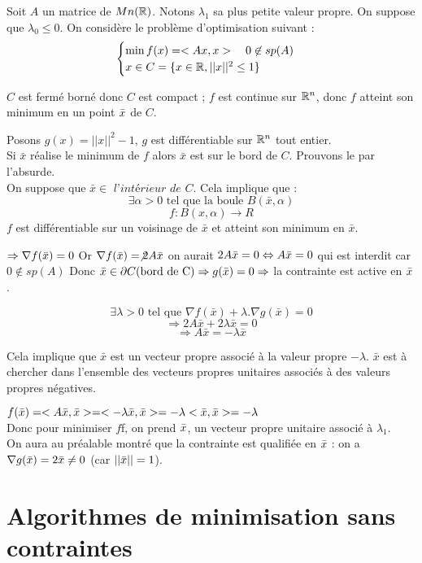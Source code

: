 \begin{exemple}


	Soit $A$ un matrice de $Mn(\mathbb{R})$. Notons $\lambda _1$ sa plus petite valeur propre. On suppose que $\lambda _0 \leq 0$. On considère le problème d'optimisation suivant : \[ \begin{cases}\min f(x) = <Ax, x> \quad 0 \not \in sp(A)\\ x \in C = \{ x \in \mathbb{R}, ||x||^2 \leq 1 \} \end{cases} \]
	
	$C$ est fermé borné donc $C$ est compact ;
	$f$ est continue sur $\mathbb{R}^n$, donc $f$ atteint son minimum en un point $\bar{x}$ de $C$.
	
	Posons $ g(x) = ||x||^2 - 1 $, $g$ est différentiable sur $\mathbb{R}^n$ tout entier.\\
Si $\bar{x}$ réalise le minimum de $f$ alors $\bar{x}$ est sur le bord de $C$. Prouvons le par l'absurde.\\
On suppose que $\bar{x} \in \textit{ l'intérieur de }C $.
Cela implique que : \[ \exists \alpha>0 \text{ tel que la boule } B(\bar{x},\alpha)  \]
\[ f : B(x,\alpha) \rightarrow R \]
$f$ est différentiable sur un voisinage de $\bar{x}$ et atteint son minimum en $\bar{x}$.
	
	$\Rightarrow \nabla f(\bar{x}) = 0$
	Or $\nabla f(\bar{x}) = \not 2A\bar{x}$
	on aurait $2A\bar{x} = 0 \Leftrightarrow A\bar{x} = 0$ qui est interdit car $0 \not \in sp(A)$
	Donc $\bar{x} \in \partial C \text{(bord de C)} \Rightarrow g(\bar{x}) = 0 \Rightarrow$ la contrainte est active en $\bar{x}$.
	
	\[ \exists \lambda > 0 \text{ tel que } \nabla f(\bar{x}) + \lambda.\nabla g(\bar{x}) = 0 \]
\[ \Rightarrow 2A\bar{x} + 2\lambda\bar{x} = 0 \]
\[ \Rightarrow A\bar{x} = - \lambda\bar{x}\]

Cela implique que $\bar{x}$ est un vecteur propre associé à la valeur propre $-\lambda$. $\bar{x}$ est à chercher dans l'ensemble des vecteurs propres unitaires associés à des valeurs propres négatives.
	
	$f(\bar{x}) = <A\bar{x}, \bar{x}> = <-\lambda \bar{x}, \bar{x}> = -\lambda <\bar{x}, \bar{x}> = - \lambda$ \\
	Donc pour minimiser $f$f, on prend $\bar{x}$, un vecteur propre unitaire associé à $\lambda_1$.\\
	On aura au préalable montré que la contrainte est qualifiée en $\bar{x}$ : on a $\nabla g(\bar{x}) = 2\bar{x} \ne 0$ (car $||\bar{x}||=1$).
	
\end{exemple}

\section{Algorithmes de minimisation sans contraintes}
